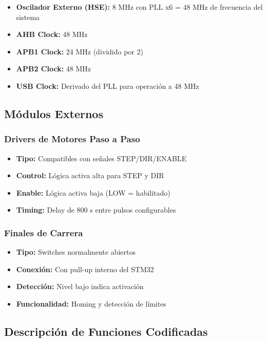 \documentclass[12pt]{article}
\begin{document}
\begin{itemize}
    \item \textbf{Oscilador Externo (HSE):} 8 MHz con PLL x6 = 48 MHz de frecuencia del sistema
    \item \textbf{AHB Clock:} 48 MHz
    \item \textbf{APB1 Clock:} 24 MHz (dividido por 2)
    \item \textbf{APB2 Clock:} 48 MHz
    \item \textbf{USB Clock:} Derivado del PLL para operación a 48 MHz
\end{itemize}


\subsection{Módulos Externos}

\subsubsection{Drivers de Motores Paso a Paso}
\begin{itemize}
    \item \textbf{Tipo:} Compatibles con señales STEP/DIR/ENABLE
    \item \textbf{Control:} Lógica activa alta para STEP y DIR
    \item \textbf{Enable:} Lógica activa baja (LOW = habilitado)
    \item \textbf{Timing:} Delay de 800 \textmu{}s entre pulsos configurables
\end{itemize}

\subsubsection{Finales de Carrera}
\begin{itemize}
    \item \textbf{Tipo:} Switches normalmente abiertos
    \item \textbf{Conexión:} Con pull-up interno del STM32
    \item \textbf{Detección:} Nivel bajo indica activación
    \item \textbf{Funcionalidad:} Homing y detección de límites
\end{itemize}


\subsection{Descripción de Funciones Codificadas}
\end{document}
